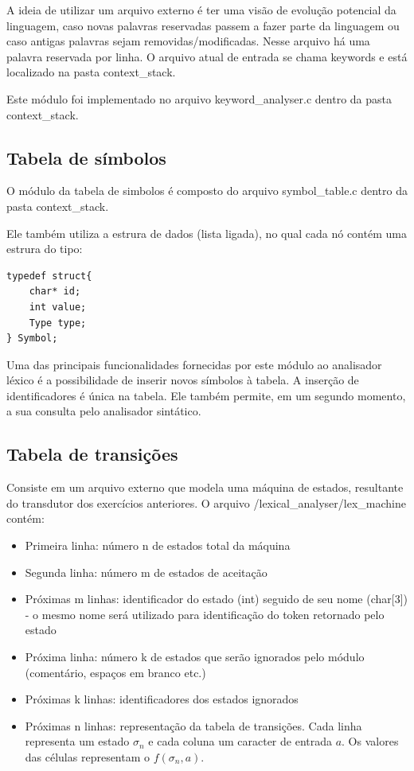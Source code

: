 A ideia de utilizar um arquivo externo é ter uma visão de evolução potencial da linguagem, caso novas palavras reservadas passem a fazer parte da linguagem ou caso antigas palavras sejam removidas/modificadas. Nesse arquivo há uma palavra reservada por linha. O arquivo atual de entrada se chama keywords e está localizado na pasta context\_stack.

Este módulo foi implementado no arquivo keyword\_analyser.c dentro da pasta context\_stack.

\subsection{Tabela de símbolos}

O módulo da tabela de simbolos é composto do arquivo symbol\_table.c dentro da pasta context\_stack.

Ele também utiliza a estrura de dados (lista ligada), no qual cada nó contém uma estrura do tipo:

\lstset{language=C}
\begin{lstlisting}[frame=single]
typedef struct{
    char* id;
    int value;
    Type type;
} Symbol;
\end{lstlisting}

Uma das principais funcionalidades fornecidas por este módulo ao analisador léxico é a possibilidade de inserir novos símbolos à tabela. A inserção de identificadores é única na tabela.
Ele também permite, em um segundo momento, a sua consulta pelo analisador sintático.

\subsection{Tabela de transições}

Consiste em um arquivo externo que modela uma máquina de estados, resultante do transdutor dos exercícios anteriores. 
O arquivo /lexical\_analyser/lex\_machine contém:

\begin{itemize}
	\item Primeira linha: número n de estados total da máquina
	\item Segunda linha: número m de estados de aceitação
	\item Próximas m linhas: identificador do estado (int) seguido de seu nome (char[3]) - o mesmo nome será utilizado para identificação do token retornado pelo estado
	\item Próxima linha: número k de estados que serão ignorados pelo módulo (comentário, espaços em branco etc.)
	\item Próximas k linhas: identificadores dos estados ignorados
	\item Próximas n linhas: representação da tabela de transições. Cada linha representa um estado $\sigma_n$ e cada coluna um caracter de entrada $a$. Os valores das células representam o $f(\sigma_n, a)$.
\end{itemize}

